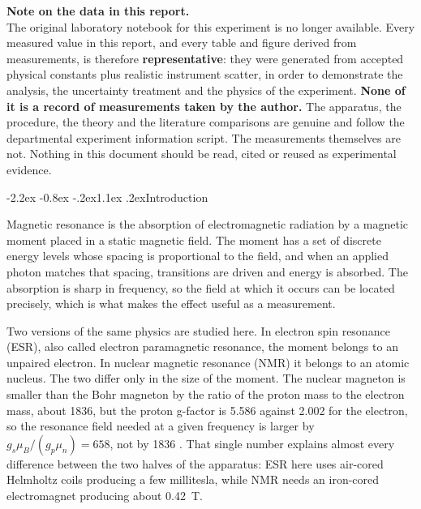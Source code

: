 \documentclass[11pt,a4paper]{article}
\makeatletter
\renewcommand\section{\@startsection{section}{1}{\z@}%
  {-2.2ex \@plus -0.8ex \@minus -.2ex}{1.1ex \@plus .2ex}{\normalfont\large\bfseries}}
\makeatother
\begin{document}
\begin{mdframed}[backgroundcolor=gray!12, linecolor=gray!60, linewidth=0.8pt,
                 innertopmargin=8pt, innerbottommargin=8pt, innerleftmargin=10pt,
                 innerrightmargin=10pt, roundcorner=2pt]
\textbf{Note on the data in this report.}\\[2pt]
The original laboratory notebook for this experiment is no longer available. Every measured value
in this report, and every table and figure derived from measurements, is therefore
\textbf{representative}: they were generated
from accepted physical constants plus realistic instrument scatter, in order to demonstrate the
analysis, the uncertainty treatment and the physics of the experiment. \textbf{None of it is a
record of measurements taken by the author.} The apparatus, the procedure, the theory and the
literature comparisons are genuine and follow the departmental experiment information script.
The measurements themselves are not. Nothing in this document should be read, cited or reused as
experimental evidence.
\end{mdframed}

\section{Introduction}

Magnetic resonance is the absorption of electromagnetic radiation by a magnetic moment placed in
a static magnetic field. The moment has a set of discrete energy levels whose spacing is
proportional to the field, and when an applied photon matches that spacing, transitions are
driven and energy is absorbed. The absorption is sharp in frequency, so the field at which it
occurs can be located precisely, which is what makes the effect useful as a measurement.

Two versions of the same physics are studied here. In electron spin resonance (ESR), also called
electron paramagnetic resonance, the moment belongs to an unpaired electron. In nuclear magnetic
resonance (NMR) it belongs to an atomic nucleus. The two differ only in the size of the moment.
The nuclear magneton is smaller than the Bohr magneton by the ratio of the proton mass to the
electron mass, about 1836, but the proton g-factor is 5.586 against 2.002 for the electron, so
the resonance field needed at a given frequency is larger by $g_s\mu_B/(g_p\mu_n) = 658$, not by
1836 \cite{codata}. That single number explains almost every difference
between the two halves of the apparatus: ESR here uses air-cored Helmholtz coils producing a few
millitesla, while NMR needs an iron-cored electromagnet producing about \SI{0.42}{\tesla}.
\end{document}
